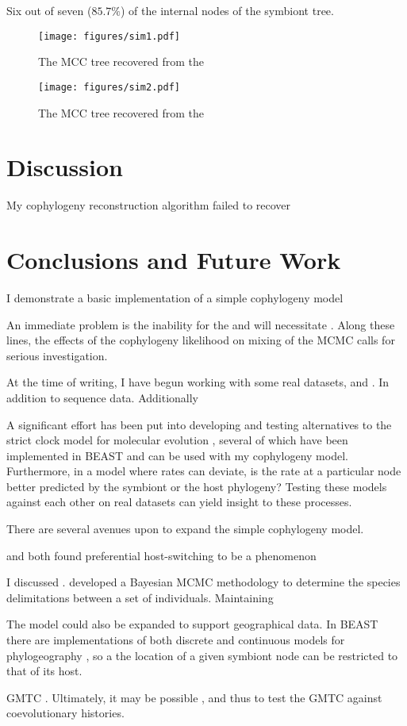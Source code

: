 \documentclass[12pt,letterpaper]{article}
\begin{document}
Six out of seven ($85.7\%$) of the internal nodes of the symbiont tree.
 
\begin{SCfigure}[0.66]
\centering
\texttt{[image: figures/sim1.pdf]}
\caption{The \ac{MCC} tree recovered from the }
\label{fig:sim1}
\end{SCfigure}

\begin{SCfigure}[0.66]
\centering
\texttt{[image: figures/sim2.pdf]}
\caption{The \ac{MCC} tree recovered from the }
\label{fig:sim1}
\end{SCfigure}


\section*{Discussion}

My cophylogeny reconstruction algorithm failed to recover 

\section*{Conclusions and Future Work}

I demonstrate a basic implementation of a simple cophylogeny model

An immediate problem is the inability for the and will necessitate . Along these lines, the effects of the cophylogeny likelihood on mixing of the \ac{MCMC} calls for serious investigation. 

At the time of writing, I have begun working with some real datasets, and . In addition to sequence data. Additionally

A significant effort has been put into developing and testing alternatives to the strict clock model for molecular evolution \parencites{Drummond:2006}{Drummond:2010}{Baele:2012b}, several of which have been implemented in BEAST and can be used with my cophylogeny model. Furthermore, in a model where rates can deviate, is the rate at a particular node better predicted by the symbiont or the host phylogeny? Testing these models against each other on real datasets can yield insight to these processes.

There are several avenues upon to expand the simple cophylogeny model. 

\textcite{Charleston:2002} and \textcite{Faria:2013} both found preferential host-switching to be a phenomenon 

I discussed . \textcite{Yang:2010} developed a Bayesian \ac{MCMC} methodology to determine the species delimitations between a set of individuals. Maintaining 

The model could also be expanded to support geographical data. In BEAST there are implementations of both discrete and continuous models for phylogeography \parencites{Lemey:2009}{Lemey:2010}, so a the location of a given symbiont node can be restricted to that of its host.

\ac{GMTC} . Ultimately, it may be possible , and thus to test the \ac{GMTC} against coevolutionary histories.

\printbibliography
\end{document}
